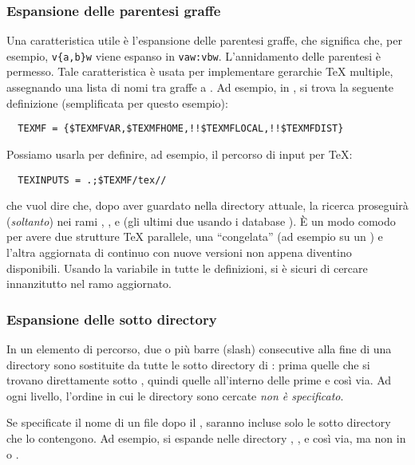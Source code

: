 \documentclass{article}
\begin{document}
\subsubsection{Espansione delle parentesi graffe}
\label{sec:brace-expansion}

Una caratteristica utile è l'espansione delle parentesi graffe, che
significa che, per esempio, \verb+v{a,b}w+ viene espanso in
\verb+vaw:vbw+. L'annidamento delle parentesi è permesso. Tale
caratteristica è usata per implementare gerarchie \TeX{} multiple,
assegnando una lista di nomi tra graffe a . Ad esempio, in
, si trova la seguente definizione (semplificata per questo
esempio):
\begin{verbatim}
  TEXMF = {$TEXMFVAR,$TEXMFHOME,!!$TEXMFLOCAL,!!$TEXMFDIST}
\end{verbatim}
Possiamo usarla per definire, ad esempio, il percorso di input per \TeX:
\begin{verbatim}
  TEXINPUTS = .;$TEXMF/tex//
\end{verbatim}
che vuol dire che, dopo aver guardato nella directory attuale, la ricerca
proseguirà (\emph{soltanto}) nei rami ,
,  e 
(gli ultimi due usando i database ). È un modo comodo
per avere due strutture \TeX{} parallele, una ``congelata'' (ad
esempio su un \CD) e l'altra aggiornata di continuo con nuove versioni non
appena diventino disponibili. Usando la variabile  in tutte
le definizioni, si è sicuri di cercare innanzitutto nel ramo
aggiornato.

\subsubsection{Espansione delle sotto directory}
\label{sec:subdirectory-expansion}

In un elemento di percorso, due o più barre (slash) consecutive alla fine
di una directory  sono sostituite da tutte le sotto directory di
: prima quelle che si trovano direttamente sotto , quindi
quelle all'interno delle prime e così via. Ad ogni livello, l'ordine in
cui le directory sono cercate \emph{non è specificato}.

Se specificate il nome di un file dopo il \samp{//}, saranno incluse solo
le sotto directory che lo contengono. Ad esempio,  si
espande nelle directory , ,  e
così via, ma non in  o .
\end{document}
